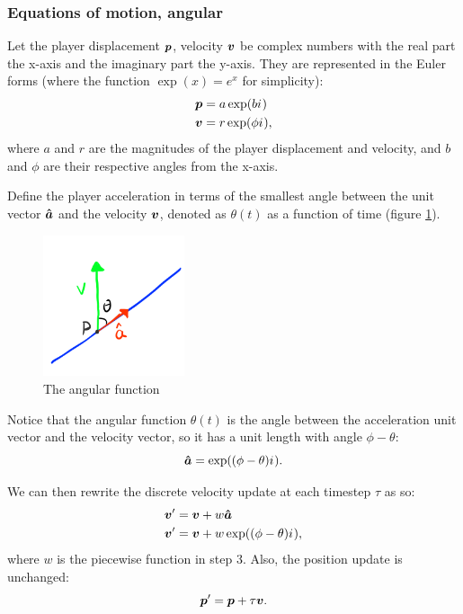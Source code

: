 
\subsubsection{Equations of motion, angular}
Let the player displacement $\boldsymbol{p}$, velocity $\boldsymbol{v}$ be complex numbers with the real part the x-axis and the imaginary part the y-axis. They are represented in the Euler forms (where the function $\exp(x)= e^{x}$ for simplicity):
\begin{align*}
    \boldsymbol{p} &= a \exp(b {i\mkern1mu})\\
    \boldsymbol{v} &= r \exp(\phi {i\mkern1mu}),
\end{align*}
where $a$ and $r$ are the magnitudes of the player displacement and velocity, and $b$ and $\phi$ are their respective angles from the x-axis.

Define the player acceleration in terms of the smallest angle between the unit vector $\boldsymbol{\hat{a}}$ and the velocity $\boldsymbol{v}$, denoted as $\theta(t)$ as a function of time (figure \ref{fig:angular}).

\begin{figure}
    \includegraphics[width=0.37\textwidth,right]{assets/angular.png}
    \caption{The angular function}
    \label{fig:angular}
\end{figure}

Notice that the angular function $\theta(t)$ is the angle between the acceleration unit vector and the velocity vector, so it has a unit length with angle $\phi - \theta$:
\[
    \boldsymbol{\hat{a}} = \exp((\phi - \theta) {i\mkern1mu}).
\]

We can then rewrite the discrete velocity update at each timestep $\tau$ as so:
\begin{align*}
    \boldsymbol{v}' &= \boldsymbol{v} + w \boldsymbol{\hat{a}}\\
    \boldsymbol{v}' &= \boldsymbol{v} + w \exp((\phi - \theta) {i\mkern1mu}),
\end{align*}
where $w$ is the piecewise function in step 3. Also, the position update is unchanged:
\[
    \boldsymbol{p}' = \boldsymbol{p} + \tau \boldsymbol{v}.
\]

